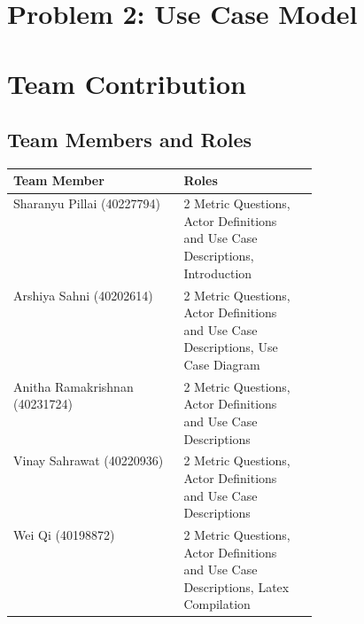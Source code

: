 \documentclass[english,12pt,a4paper]{report}
\begin{document}
	\chapter{Problem 2: Use Case Model}
	
	
	\chapter{Team Contribution}
	\section{Team Members and Roles}
	\begin{center}
		\begin{tabular}{|l|p{0.4\linewidth}|l|}
			\hline
			\textbf{Team Member} & \textbf{Roles}\\
			\hline
			Sharanyu Pillai (40227794) & 2 Metric Questions, Actor Definitions and Use Case Descriptions, Introduction\\
			\hline
			Arshiya Sahni (40202614) & 2 Metric Questions, Actor Definitions and Use Case Descriptions, Use Case Diagram\\
			\hline
			Anitha Ramakrishnan (40231724) & 2 Metric Questions, Actor Definitions and Use Case Descriptions\\
			\hline
			Vinay Sahrawat (40220936) & 2 Metric Questions, Actor Definitions and Use Case Descriptions\\
			\hline
			Wei Qi (40198872) & 2 Metric Questions, Actor Definitions and Use Case Descriptions, Latex Compilation \\
			\hline
		\end{tabular}
	\end{center}
	
	
	
\end{document}
